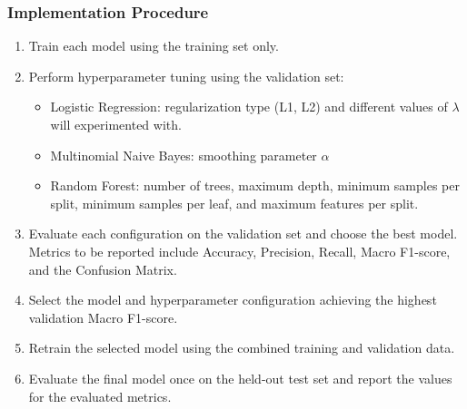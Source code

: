 \documentclass[12pt]{article}
\begin{document}
\subsubsection*{Implementation Procedure} 
\begin{enumerate} 
    \item Train each model using the training set only. 
    \item Perform hyperparameter tuning using the validation set: 
    \begin{itemize} 
        \item Logistic Regression: regularization type (L1, L2) and different values of $\lambda$ will experimented with.
        \item Multinomial Naive Bayes: smoothing parameter $\alpha$
        \item Random Forest: number of trees, maximum depth, minimum samples per split, minimum samples per leaf, and maximum features per split. 
    \end{itemize} 
    \item Evaluate each configuration on the validation set and choose the best model. Metrics to be reported include Accuracy, Precision, Recall, Macro F1-score, and the Confusion Matrix. 
    \item Select the model and hyperparameter configuration achieving the highest validation Macro F1-score. 
    \item Retrain the selected model using the combined training and validation data. 
    \item Evaluate the final model once on the held-out test set and report the values for the evaluated metrics. 
\end{enumerate}
\end{document}

